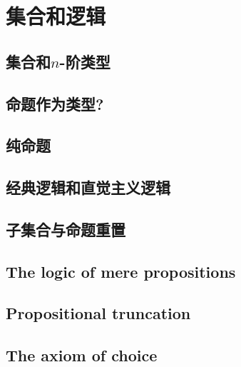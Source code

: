 \chapter{集合和逻辑}
\label{cha:logic}


\section{集合和\texorpdfstring{$n$}{n}-阶类型}
\label{sec:basics-sets}


\section{命题作为类型?}
\label{subsec:pat?}


\section{纯命题}
\label{subsec:hprops}


\section{经典逻辑和直觉主义逻辑}
\label{sec:intuitionism}


\section{子集合与命题重置}
\label{subsec:prop-subsets}


\section{The logic of mere propositions}
\label{subsec:logic-hprop}


\section{Propositional truncation}
\label{subsec:prop-trunc}


\section{The axiom of choice}
\label{sec:axiom-choice}


